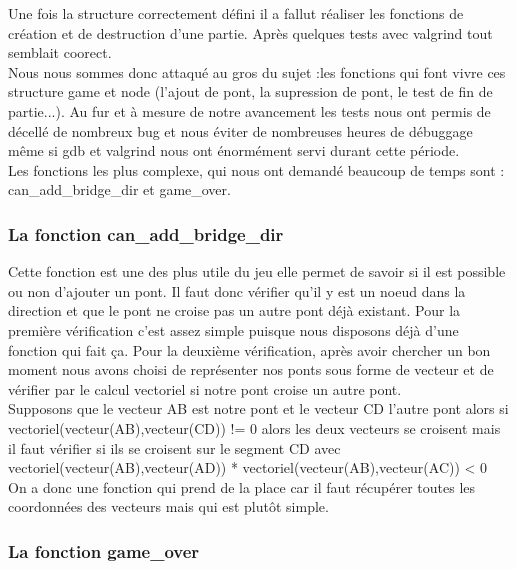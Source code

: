 \documentclass[12pt]{report}
\begin{document}
\textnormal{Une fois la structure correctement défini il a fallut réaliser les fonctions de création et de destruction d'une partie. Après quelques tests avec valgrind tout semblait coorect.\\ Nous nous sommes donc attaqué au gros du sujet :les fonctions qui font vivre ces structure game et node (l'ajout de pont, la supression de pont, le test de fin de partie...). Au fur et à mesure de notre avancement les tests nous ont permis de décellé de nombreux bug et nous éviter de nombreuses heures de débuggage même si gdb et valgrind nous ont énormément servi durant cette période.\\ Les fonctions les plus complexe, qui nous ont demandé beaucoup de temps sont : can\_add\_bridge\_dir et game\_over.}

\subsubsection{La fonction can\_add\_bridge\_dir}
\textnormal{Cette fonction est une des plus utile du jeu elle permet de savoir si il est possible ou non d'ajouter un pont. Il faut donc vérifier qu'il y est un noeud dans la direction et que le pont ne croise pas un autre pont déjà existant. Pour la première vérification c'est assez simple puisque nous disposons déjà d'une fonction qui fait ça. Pour la deuxième vérification, après avoir chercher un bon moment nous avons choisi de représenter nos ponts sous forme de vecteur et de vérifier par le calcul vectoriel si notre pont croise un autre pont. \\ Supposons que le vecteur AB est notre pont et le vecteur CD l'autre pont alors si vectoriel(vecteur(AB),vecteur(CD)) != 0 alors les deux vecteurs se croisent mais il faut vérifier si ils se croisent sur le segment CD avec vectoriel(vecteur(AB),vecteur(AD)) * vectoriel(vecteur(AB),vecteur(AC)) < 0 \\ On a donc une fonction qui prend de la place car il faut récupérer toutes les coordonnées des vecteurs mais qui est plutôt simple.}

\subsubsection{La fonction game\_over}
\end{document}
